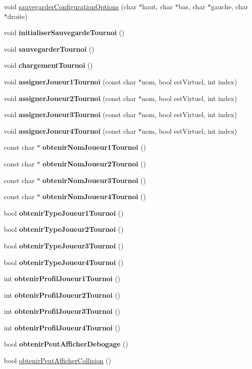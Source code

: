 \begin{DoxyCompactItemize}
\item 
void \hyperlink{group__inf2990_ga2abaa6d8b60740932e156fcdac94fe33}{sauvegarder\+Configuration\+Options} (char $\ast$haut, char $\ast$bas, char $\ast$gauche, char $\ast$droite)
\item 
void {\bfseries initialiser\+Sauvegarde\+Tournoi} ()
\item 
void {\bfseries sauvegarder\+Tournoi} ()
\item 
void {\bfseries chargement\+Tournoi} ()
\item 
void {\bfseries assigner\+Joueur1\+Tournoi} (const char $\ast$nom, bool est\+Virtuel, int index)
\item 
void {\bfseries assigner\+Joueur2\+Tournoi} (const char $\ast$nom, bool est\+Virtuel, int index)
\item 
void {\bfseries assigner\+Joueur3\+Tournoi} (const char $\ast$nom, bool est\+Virtuel, int index)
\item 
void {\bfseries assigner\+Joueur4\+Tournoi} (const char $\ast$nom, bool est\+Virtuel, int index)
\item 
const char $\ast$ {\bfseries obtenir\+Nom\+Joueur1\+Tournoi} ()
\item 
const char $\ast$ {\bfseries obtenir\+Nom\+Joueur2\+Tournoi} ()
\item 
const char $\ast$ {\bfseries obtenir\+Nom\+Joueur3\+Tournoi} ()
\item 
const char $\ast$ {\bfseries obtenir\+Nom\+Joueur4\+Tournoi} ()
\item 
bool {\bfseries obtenir\+Type\+Joueur1\+Tournoi} ()
\item 
bool {\bfseries obtenir\+Type\+Joueur2\+Tournoi} ()
\item 
bool {\bfseries obtenir\+Type\+Joueur3\+Tournoi} ()
\item 
bool {\bfseries obtenir\+Type\+Joueur4\+Tournoi} ()
\item 
int {\bfseries obtenir\+Profil\+Joueur1\+Tournoi} ()
\item 
int {\bfseries obtenir\+Profil\+Joueur2\+Tournoi} ()
\item 
int {\bfseries obtenir\+Profil\+Joueur3\+Tournoi} ()
\item 
int {\bfseries obtenir\+Profil\+Joueur4\+Tournoi} ()
\item 
bool {\bfseries obtenir\+Peut\+Afficher\+Debogage} ()
\item 
bool \hyperlink{group__inf2990_gaf53d5c1a7b11c7a187080ce3e58811f4}{obtenir\+Peut\+Afficher\+Collision} ()
\item 

\end{DoxyCompactItemize}
